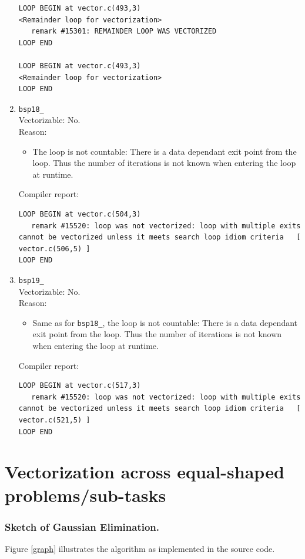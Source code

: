 \documentclass[11pt]{article}
\begin{document}
\begin{enumerate}
\begin{lstlisting}
LOOP BEGIN at vector.c(493,3)
<Remainder loop for vectorization>
   remark #15301: REMAINDER LOOP WAS VECTORIZED
LOOP END

LOOP BEGIN at vector.c(493,3)
<Remainder loop for vectorization>
LOOP END
\end{lstlisting}

\item \texttt{bsp18\_}\\
Vectorizable: No.\\
Reason:
\begin{itemize}
\item The loop is not countable: There is a data dependant exit point from the loop. Thus the number of iterations is not known when entering the loop at runtime.
\end{itemize}
Compiler report:
\begin{lstlisting}
LOOP BEGIN at vector.c(504,3)
   remark #15520: loop was not vectorized: loop with multiple exits cannot be vectorized unless it meets search loop idiom criteria   [ vector.c(506,5) ]
LOOP END
\end{lstlisting}

\item \texttt{bsp19\_}\\
Vectorizable: No.\\
Reason:
\begin{itemize}
\item Same as for \texttt{bsp18\_}, the loop is not countable: There is a data dependant exit point from the loop. Thus the number of iterations is not known when entering the loop at runtime.
\end{itemize}
Compiler report:
\begin{lstlisting}
LOOP BEGIN at vector.c(517,3)
   remark #15520: loop was not vectorized: loop with multiple exits cannot be vectorized unless it meets search loop idiom criteria   [ vector.c(521,5) ]
LOOP END
\end{lstlisting}
\end{enumerate}

\section{Vectorization across equal-shaped problems/sub-tasks}
\subsubsection*{Sketch of Gaussian Elimination.}
Figure \ref{graph} illustrates the algorithm as implemented in the source code.
\end{document}
